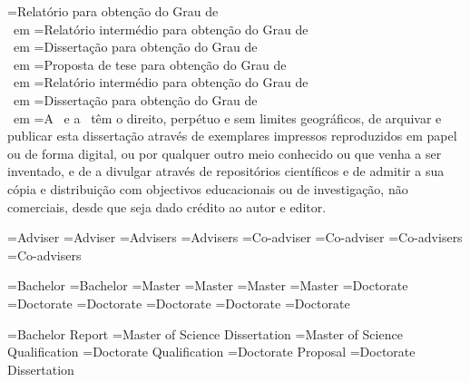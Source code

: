 \UNL@dissertationstr[bsc,pt]={Relatório para obtenção do Grau de \\\UNL@degree\ em \@majorfield}
\UNL@dissertationstr[prepmsc,pt]={Relatório intermédio para obtenção do Grau de \\\UNL@degree\ em \@majorfield}
\UNL@dissertationstr[msc,pt]={Dissertação para obtenção do Grau de \\\UNL@degree\ em \@majorfield}
\UNL@dissertationstr[propphd,pt]={Proposta de tese para obtenção do Grau de \\\UNL@degree\ em \@majorfield}
\UNL@dissertationstr[prepphd,pt]={Relatório intermédio para obtenção do Grau de \\\UNL@degree\ em \@majorfield}
\UNL@dissertationstr[phd,pt]={Dissertação para obtenção do Grau de \\\UNL@degree\ em \@majorfield}
\UNL@copyrighttext[pt]={A \@faculty\ e a \@university\ têm o direito, perpétuo e sem limites geográficos, de arquivar e publicar esta dissertação através de exemplares impressos reproduzidos em papel ou de forma digital, ou por qualquer outro meio conhecido ou que venha a ser inventado, e de a divulgar através de repositórios científicos e de admitir a sua cópia e distribuição com objectivos educacionais ou de investigação, não comerciais, desde que seja dado crédito ao autor e editor.}




\UNL@adviserstr[1,m,en]={Adviser}
\UNL@adviserstr[1,f,en]={Adviser}
\UNL@adviserstr[2,m,en]={Advisers}
\UNL@adviserstr[2,f,en]={Advisers}
\UNL@coadviserstr[1,m,en]={Co-adviser}
\UNL@coadviserstr[1,f,en]={Co-adviser}
\UNL@coadviserstr[2,m,en]={Co-advisers}
\UNL@coadviserstr[2,f,en]={Co-advisers}

\UNL@degreestr[bsc,m,en]={Bachelor}
\UNL@degreestr[bsc,f,en]={Bachelor}
\UNL@degreestr[msc,m,en]={Master}
\UNL@degreestr[msc,f,en]={Master}
\UNL@degreestr[prepmsc,m,en]={Master}
\UNL@degreestr[prepmsc,f,en]={Master}
\UNL@degreestr[phd,m,en]={Doctorate}
\UNL@degreestr[phd,f,en]={Doctorate}
\UNL@degreestr[prepphd,m,en]={Doctorate}
\UNL@degreestr[prepphd,f,en]={Doctorate}
\UNL@degreestr[propphd,m,en]={Doctorate}
\UNL@degreestr[propphd,f,en]={Doctorate}

\UNL@doctypestr[bsc,en]={Bachelor Report}
\UNL@doctypestr[msc,en]={Master of Science Dissertation}
\UNL@doctypestr[prepmsc,en]={Master of Science Qualification}
\UNL@doctypestr[prepphd,en]={Doctorate Qualification}
\UNL@doctypestr[propphd,en]={Doctorate Proposal}
\UNL@doctypestr[phd,en]={Doctorate Dissertation}

